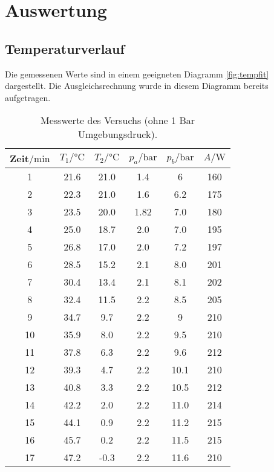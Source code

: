 \section{Auswertung}
\label{sec:Auswertung}
\subsection{Temperaturverlauf}
Die gemessenen Werte sind in einem geeigneten Diagramm \ref{fig:tempfit} dargestellt.
Die Ausgleichsrechnung wurde in diesem Diagramm bereits aufgetragen.
\begin{table}[H]
    \centering
    \caption{Messwerte des Versuchs (ohne 1 Bar Umgebungsdruck).}
    \label{tab:t1}
    \begin{tabular}{S[table-format=2.0] S S S S S[table-format=3.0]}
        \toprule
        {Zeit$/\si{\minute}$} & {$T_1/\si{\celsius}$} & {$T_2/\si{\celsius}$} & {$p_a/\si{\bar}$} & {$p_b/\si{\bar}$} & {$A/\si{\watt}$}\\
           & 21.6  & 21.0  & 1.4   & 6     & 160   \\
        2   & 22.3  & 21.0  & 1.6   & 6.2   & 175   \\
        3   & 23.5  & 20.0  & 1.82  & 7.0   & 180   \\
        4   & 25.0  & 18.7  & 2.0   & 7.0   & 195   \\
        5   & 26.8  & 17.0  & 2.0   & 7.2   & 197   \\
        6   & 28.5  & 15.2  & 2.1   & 8.0   & 201   \\
        7   & 30.4  & 13.4  & 2.1   & 8.1   & 202   \\
        8   & 32.4  & 11.5  & 2.2   & 8.5   & 205   \\
        9   & 34.7  & 9.7   & 2.2   & 9     & 210   \\
        10  & 35.9  & 8.0   & 2.2   & 9.5   & 210   \\
        11  & 37.8  & 6.3   & 2.2   & 9.6   & 212   \\
        12  & 39.3  & 4.7   & 2.2   & 10.1  & 210   \\
        13  & 40.8  & 3.3   & 2.2   & 10.5  & 212   \\
        14  & 42.2  & 2.0   & 2.2   & 11.0  & 214   \\
        15  & 44.1  & 0.9   & 2.2   & 11.2  & 215   \\
        16  & 45.7  & 0.2   & 2.2   & 11.5  & 215   \\
        17  & 47.2  & -0.3  & 2.2   & 11.6  & 210   \\
        \bottomrule
    \end{tabular}
\end{table}
